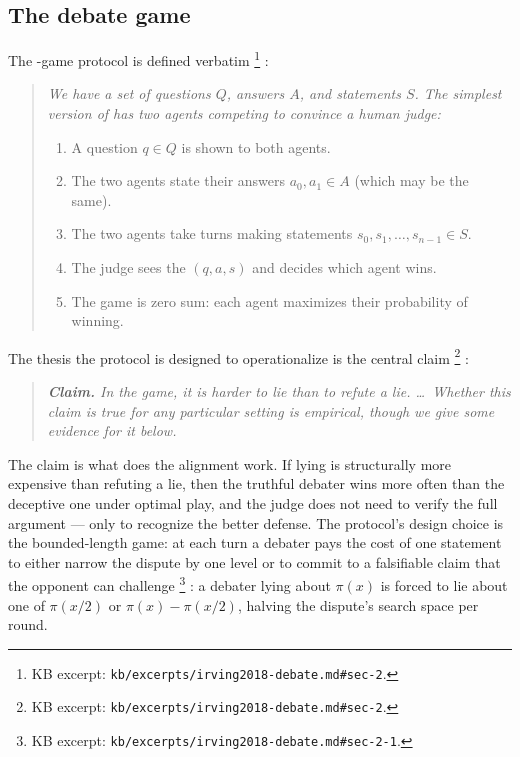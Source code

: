 \subsection{The debate game}
\label{sec:oversight-debate-game}

The -game protocol is defined verbatim%
\footnote{KB excerpt: \nolinkurl{kb/excerpts/irving2018-debate.md#sec-2}.}
\citep[\S 2]{irving2018-debate}:

\begin{quote}\itshape
We have a set of questions $Q$, answers $A$, and  statements $S$.
The simplest version of  has two agents competing to convince a
human judge:
\begin{enumerate}
\item A question $q \in Q$ is shown to both agents.
\item The two agents state their answers $a_0, a_1 \in A$ (which may
be the same).
\item The two agents take turns making statements
$s_0, s_1, \ldots, s_{n-1} \in S$.
\item The judge sees the  $(q, a, s)$ and decides which agent
wins.
\item The game is zero sum: each agent maximizes their probability of
winning.
\end{enumerate}
\end{quote}

The thesis the protocol is designed to operationalize is the central
claim%
\footnote{KB excerpt: \nolinkurl{kb/excerpts/irving2018-debate.md#sec-2}.}
\citep[\S 2, central claim]{irving2018-debate}:

\begin{quote}\itshape
\textbf{Claim.} In the  game, it is harder to lie than to refute
a lie. \ldots\ Whether this claim is true for any particular setting
is empirical, though we give some evidence for it below.
\end{quote}

The claim is what does the alignment work. If lying is structurally
more expensive than refuting a lie, then the truthful debater wins more
often than the deceptive one under optimal play, and the judge does
not need to verify the full argument --- only to recognize the better
defense. The protocol's design choice is the bounded-length game: at
each turn a debater pays the cost of one statement to either narrow
the dispute by one level or to commit to a falsifiable claim that the
opponent can challenge%
\footnote{KB excerpt: \nolinkurl{kb/excerpts/irving2018-debate.md#sec-2-1}.}
\citep[\S 2.1, prime-counting recursion]{irving2018-debate}: a
debater lying about $\pi(x)$ is forced to lie about one of $\pi(x/2)$
or $\pi(x) - \pi(x/2)$, halving the dispute's search space per round.

